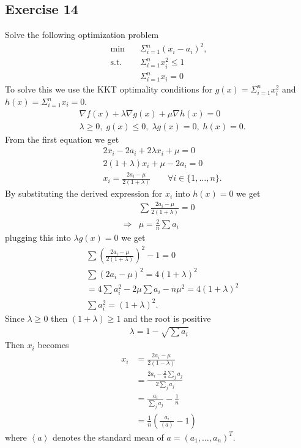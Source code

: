 \subsection{Exercise  14}
Solve the following optimization problem
\begin{align}
    \text{min}\quad & \Sigma_{i=1}^{n} \left( x_i - a_i \right)^{2},\\
    \text{s.t.}\quad & \Sigma_{i=1}^{n} x_i^{2} \le 1 \nonumber\\
    & \Sigma_{i=1}^{n} x_i = 0 \nonumber
\end{align}
To solve this we use the KKT optimality conditions for $g(x) =
\Sigma_{i=1}^{n}x_i^{2}$ and $h(x) = \Sigma_{i=1}^{n}x_i=0$.
\begin{align}
    &\nabla f(x) + \lambda \nabla g(x)
    +\mu \nabla h(x)= 0\\
    &\lambda \ge 0,\; g(x) \le 0,\; \lambda g(x) = 0, \;h(x) = 0.
\end{align}
From the first equation we get
\begin{align}
    &2x_i - 2a_i + 2  \lambda x_i + \mu = 0 \\
    &2\left( 1+\lambda \right) x_i +\mu -2a_i = 0\\
    &x_i=  \frac{2a_i - \mu}{2(1+\lambda)}
    \qquad \forall i \in
    \{1,\ldots,n\}.
\end{align}
By substituting the derived expression for $x_i$ into $h(x) =0$ we get
\begin{align}
    &\sum\frac{2a_i - \mu}{2(1+\lambda)} = 0\\
    \Rightarrow & \mu = \frac{2}{n}\sum a_i
\end{align}
plugging this into $\lambda g(x) = 0$ we get
\begin{align}
    &\sum \left( \frac{2a_i-\mu}{2\left( 1+\lambda \right)} \right)
    ^{2}-1=0\\
    &\sum \left( 2a_i -\mu \right)^{2} = 4(1+\lambda)^{2}\\
    &=4 \sum a_i^{2}-2\mu \sum a_i - n \mu^{2}= 4\left( 1+\lambda
    \right)^{2}\\
    &\sum a_i^{2} = (1+\lambda)^{2}.
\end{align}
Since $\lambda \ge 0 $ then $(1+\lambda) \ge 1$ and the root is positive
\begin{align}
    \lambda = 1 - \sqrt{\sum a_i}
\end{align}
Then $x_i$ becomes
\begin{align}
    x_i &= \frac{2a_i - \mu}{2(1-\lambda)} \\
        &= \frac{2a_i - \frac{2}{n}\sum_j a_j}{2\sum_j a_j}\\
        &= \frac{a_i}{\sum_j a_j} - \frac{1}{n}\\
        &= \frac{1}{n}\left( \frac{a_i}{\left\langle a \right\rangle } -1 \right)
\end{align}
where $\left\langle a \right\rangle$ denotes the standard mean of
$a=(a_1,\ldots,a_n)^{T}$.
